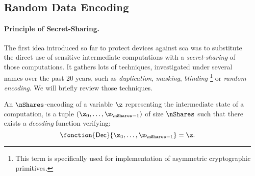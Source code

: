 \subsection{Random Data Encoding}
\label{sec:masking}
\paragraph{Principle of Secret-Sharing.}
The first idea introduced so far to protect devices against \gls{sca} was to substitute the direct use of sensitive intermediate computations with a \emph{secret-sharing} of those computations.
It gathers lots of techniques, investigated under several names over the past \(20\) years, such as \emph{duplication}, \emph{masking}, \emph{blinding}%
\footnote{
    This term is specifically used for implementation of asymmetric cryptographic primitives.
}
or \emph{random encoding}.
We will briefly review those techniques.
\begin{definition}[Encoding]
    An \(\nShares\)-encoding of a variable \(\z\) representing the intermediate state of a computation, is a tuple \((\z_0, \ldots, \z_{\nShares-1})\) of size \(\nShares\) such that there exists a \emph{decoding} function verifying:
    \begin{equation}
        \fonction{\mathsf{Dec}}{\z_0, \ldots, \z_{\nShares-1}} = \z.
    \end{equation}
\end{definition}

